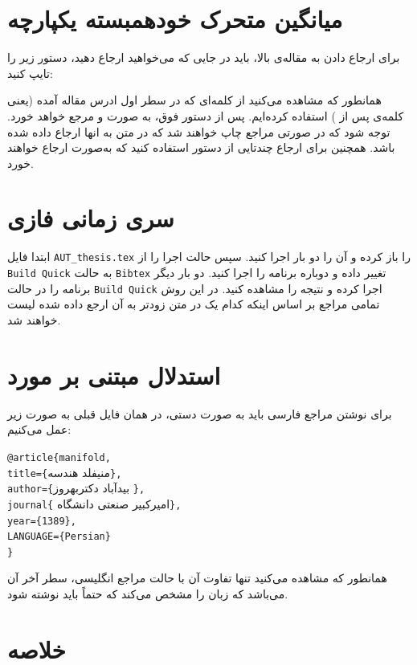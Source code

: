 \section{میانگین متحرک خودهمبسته یکپارچه}
برای ارجاع دادن به مقاله‌ی بالا، باید در جایی که می‌خواهید ارجاع دهید، دستور زیر را تایپ کنید:
\begin{latin}
\end{latin}
همانطور که مشاهده می‌کنید از کلمه‌ای که در سطر اول ادرس مقاله آمده (یعنی کلمه‌ی پس از
)
استفاده کرده‌ایم. پس از دستور فوق، به صورت \cite{bidabad2007classification} و \cite{aa} مرجع خواهد خورد. توجه شود که در صورتی مراجع چاپ خواهند شد که در متن به انها ارجاع داده شده باشد. همچنین برای ارجاع چندتایی از دستور 
استفاده کنید که به‌صورت \cite{najafi2008finsler, zakeri, najafi} ارجاع خواهند خورد.
\section{سری زمانی فازی}
ابتدا فایل
\verb;AUT_thesis.tex;
را باز کرده و آن را دو بار اجرا کنید. سپس حالت اجرا را از 
\verb;Build Quick;
به حالت
\verb;Bibtex;
تغییر داده و دوباره برنامه را اجرا کنید. دو بار دیگر برنامه را در حالت 
\verb;Build Quick;
اجرا کرده و نتیجه را مشاهده کنید. در این روش تمامی مراجع بر اساس اینکه کدام یک در متن زودتر به آن ارجع داده شده لیست خواهند شد.
\section{استدلال مبتنی بر مورد}
برای نوشتن مراجع فارسی باید به صورت دستی، در همان فایل قبلی به صورت زیر عمل می‌کنیم:
\begin{LTR}
\noindent\verb;@article{manifold,;\\
\verb;title={;منیفلد هندسه\verb;},;\\
\verb;author={;بیدآباد دکتربهروز \verb;},;\\
\verb;journal{; امیرکبیر صنعتی دانشگاه\verb;},;\\
\verb;year={1389},;\\
\verb;LANGUAGE={Persian};\\
\verb;};
\end{LTR}
همانطور که مشاهده می‌کنید تنها تفاوت آن با حالت مراجع انگلیسی، سطر آخر آن می‌باشد که زبان را مشخص می‌کند که حتماً باید نوشته شود.
\section{خلاصه}

